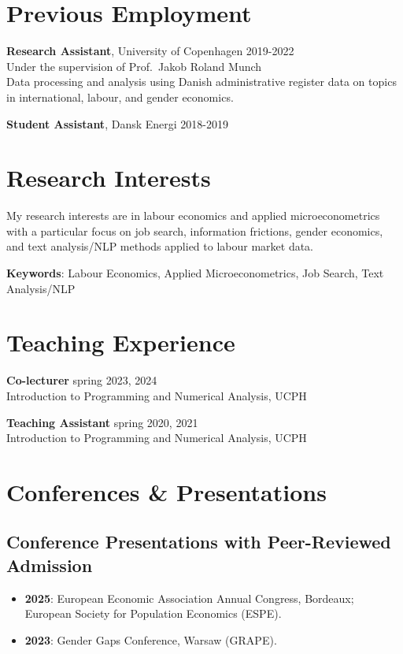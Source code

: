 \documentclass[12pt,a4paper]{article}
\newlength{\cvindent}
\newenvironment{cvbody}{%
  \begin{adjustwidth}{\cvindent}{}%
  \setlength{\parindent}{0pt}%
}{%
  \end{adjustwidth}%
}
\begin{document}
\section{Previous Employment}
\begin{cvbody}
\textbf{Research Assistant}, University of Copenhagen \hfill 2019-2022 \\
Under the supervision of Prof.\ Jakob Roland Munch \\
{\small Data processing and analysis using Danish administrative register data on topics in international, labour, and gender economics.}

\medskip
\textbf{Student Assistant}, Dansk Energi \hfill 2018-2019
\end{cvbody}

\section{Research Interests}
\begin{cvbody}
My research interests are in labour economics and applied microeconometrics with a particular focus on job search, information frictions, gender economics, and text analysis/NLP methods applied to labour market data.

\smallskip
\textbf{Keywords}: Labour Economics, Applied Microeconometrics, Job Search, Text Analysis/NLP
\end{cvbody}

\section{Teaching Experience}
\begin{cvbody}
\textbf{Co-lecturer} \hfill spring 2023, 2024 \\
Introduction to Programming and Numerical Analysis, UCPH

\medskip
\textbf{Teaching Assistant} \hfill spring 2020, 2021 \\
Introduction to Programming and Numerical Analysis, UCPH
\end{cvbody}

\section{Conferences \& Presentations}

\subsection*{\normalsize Conference Presentations with Peer-Reviewed Admission}
\begin{cvbody}
\begin{itemize}[leftmargin=1.5em, labelsep=0.5em, itemsep=4pt, parsep=0pt]
    \item \textbf{2025}: European Economic Association Annual Congress, Bordeaux; European Society for Population Economics (ESPE).
    \item \textbf{2023}: Gender Gaps Conference, Warsaw (GRAPE).
\end{itemize}
\end{cvbody}
\end{document}
